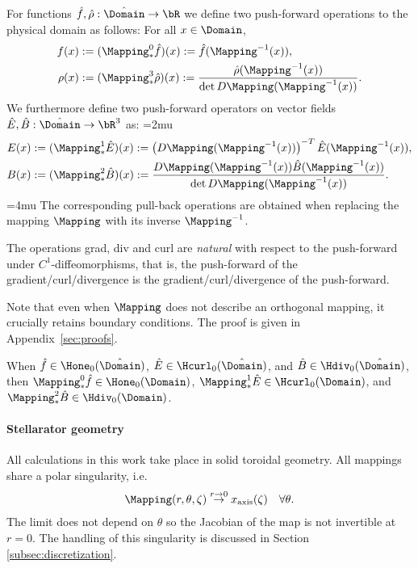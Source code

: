 \documentclass[%
 reprint,
 superscriptaddress,
 amsmath,amssymb,
 aps, nofootinbib, floatfix]{revtex4-2}
\begin{document}
\begin{definition}
\label{def:PushforwardAndPullback}
    For functions $\hat f, \hat \rho: \hat \Domain \to \bR$ we define two push-forward operations to the physical domain as follows: For all $x \in \Domain$,
    \begin{align}
    \label{eq:pushforward}
        f(x)    &:= (\Mapping^0_* \hat f)(x)    := \hat f(\Mapping^{-1}(x)),  \\
        \rho(x) &:= (\Mapping^3_* \hat \rho)(x) := \frac{\hat \rho(\Mapping^{-1}(x))}{ \det D\Mapping(\Mapping^{-1}(x))}.   
    \end{align}
    We furthermore define two push-forward operators on vector fields $\hat E, \hat B: \hat \Domain \to \bR^3$ as:
    \thickmuskip=2mu
    \begin{align}
    \label{eq:pushforward_EB}
        E(x) &:= (\Mapping^1_* \hat E)(x) := \left( D\Mapping(\Mapping^{-1}(x)) \right)^{-T} \hat E(\Mapping^{-1}(x)),   \\   
        B(x) &:= (\Mapping^2_* \hat B)(x) := \frac{ D\Mapping(\Mapping^{-1}(x)) \hat B(\Mapping^{-1}(x))}{ \det D\Mapping(\Mapping^{-1}(x)) }.   
    \end{align}
    \thickmuskip=4mu
    The corresponding pull-back operations are obtained when replacing the mapping $\Mapping$ with its inverse $\Mapping^{-1}$.
\end{definition}
\begin{lemma} 
\label{prop:push_forward_deriv_natural}The operations grad, div and curl are \emph{natural} with respect to the push-forward under $C^1$-diffeomorphisms, that is, the push-forward of the gradient/curl/divergence is the gradient/curl/divergence of the push-forward.
\end{lemma}
Note that even when $\Mapping$ does not describe an orthogonal mapping, it crucially retains boundary conditions. The proof is given in Appendix~\ref{sec:proofs}.
\begin{lemma}
\label{lem:pullback_preserves_BCs}
    When $\hat f \in \Hone_0(\hat \Domain)$, $\hat E \in \Hcurl_0(\hat \Domain)$, and $\hat B \in \Hdiv_0(\hat \Domain)$, 
    then $\Mapping^0_* \hat f \in \Hone_0(\Domain)$, $\Mapping^1_* \hat E \in \Hcurl_0(\Domain)$, and $\Mapping^2_* \hat B \in \Hdiv_0(\Domain)$.
\end{lemma}

\paragraph{Stellarator geometry}
All calculations in this work take place in solid toroidal geometry. All mappings share a polar singularity, i.e.
\begin{align}
    \Mapping (r, \theta, \zeta) \overset{r \to 0}{\to} x_\text{axis}(\zeta) \quad \forall \theta.
\end{align}
The limit does not depend on $\theta$ so the Jacobian of the map is not invertible at $r=0$. The handling of this singularity is discussed in Section \ref{subsec:discretization}.
\end{document}
